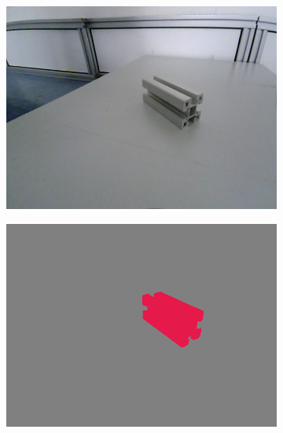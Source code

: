 	\begin{figure}[h]
		\centering
		\begin{subfigure}{.24\textwidth}
			\centering
			\includegraphics[width=1\linewidth]{images/sample_predictions/s40_40_G_013}
		\end{subfigure}
		\begin{subfigure}{.24\textwidth}
			\centering
			\includegraphics[width=1\linewidth]{images/sample_predictions/s40_40_G_013_shape_gt}
		\end{subfigure}
		\begin{subfigure}{.24\textwidth}
			\centering

\end{subfigure}
\end{figure}
